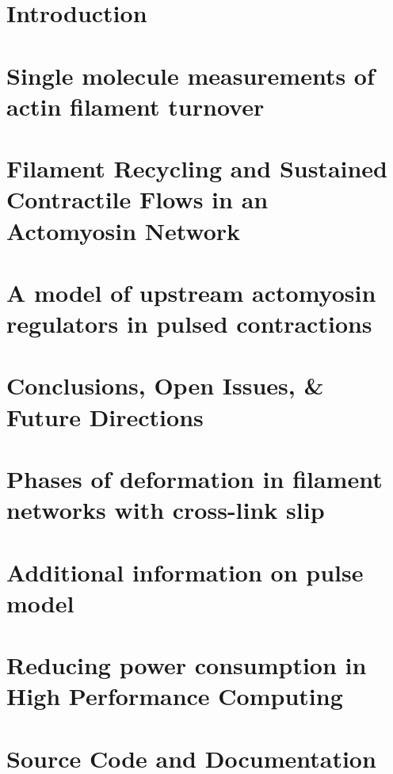 \documentclass{ucetd}
\begin{document}
\mainmatter

%
%
\chapter{Introduction}


\chapter{Single molecule measurements of actin filament turnover}


\chapter{Filament Recycling and Sustained Contractile Flows in an Actomyosin Network}
\label{sec:core}



\chapter{A model of upstream actomyosin regulators in pulsed contractions}


\chapter{Conclusions, Open Issues, \& Future Directions}


\appendix

\chapter{Phases of deformation in filament networks with cross-link slip}
\label{chap:slippage}


\chapter{Additional information on pulse model}
\label{chap:morepulse}


\chapter{Reducing power consumption in High Performance Computing}


\chapter{Source Code and Documentation}


\end{document}
